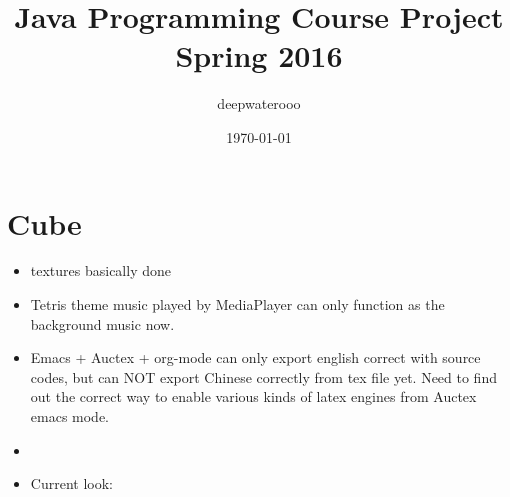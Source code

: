 \documentclass[9pt,b5paper]{article}
\author{deepwaterooo}
\date{\today}
\title{Java Programming Course Project Spring 2016}
\begin{document}
\maketitle
\tableofcontents


\section{Cube}
\label{sec-1}
\begin{itemize}
\item textures basically done
\item Tetris theme music played by MediaPlayer can only function as the background music now.
\item Emacs + Auctex + org-mode can only export english correct with source codes, but can NOT export Chinese correctly from tex file yet. Need to find out the correct way to enable various kinds of latex engines from Auctex emacs mode.
\item 
\item Current look:
\end{itemize}
\end{document}

